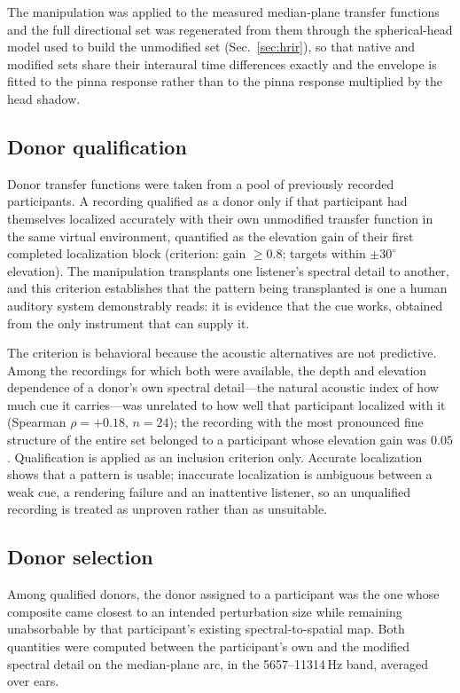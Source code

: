 The manipulation was applied to the measured median-plane transfer functions
and the full directional set was regenerated from them through the
spherical-head model used to build the unmodified set (Sec.~\ref{sec:hrir}), so
that native and modified sets share their interaural time differences exactly
and the envelope is fitted to the pinna response rather than to the pinna
response multiplied by the head shadow.

\subsection{Donor qualification}

Donor transfer functions were taken from a pool of previously recorded
participants. A recording qualified as a donor only if that participant had
themselves localized accurately with their own unmodified transfer function in
the same virtual environment, quantified as the elevation gain of their first
completed localization block (criterion: gain $\geq 0.8$; targets within
$\pm30^\circ$ elevation). The manipulation transplants one listener's spectral
detail to another, and this criterion establishes that the pattern being
transplanted is one a human auditory system demonstrably reads: it is evidence
that the cue works, obtained from the only instrument that can supply it.

The criterion is behavioral because the acoustic alternatives are not
predictive. Among the recordings for which both were available, the depth and
elevation dependence of a donor's own spectral detail---the natural acoustic
index of how much cue it carries---was unrelated to how well that participant
localized with it (Spearman $\rho = +0.18$, $n = 24$); the recording with the
most pronounced fine structure of the entire set belonged to a participant whose
elevation gain was $0.05$. Qualification is applied as an inclusion criterion
only. Accurate localization shows that a pattern is usable; inaccurate
localization is ambiguous between a weak cue, a rendering failure and an
inattentive listener, so an unqualified recording is treated as unproven rather
than as unsuitable.

\subsection{Donor selection}

Among qualified donors, the donor assigned to a participant was the one whose
composite came closest to an intended perturbation size while remaining
unabsorbable by that participant's existing spectral-to-spatial map. Both
quantities were computed between the participant's own and the modified spectral
detail on the median-plane arc, in the 5657--11314\,Hz band, averaged over ears.

